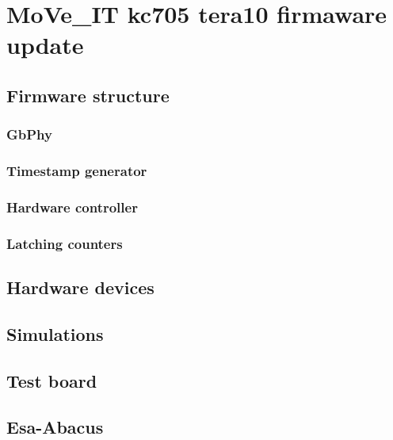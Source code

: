 \chapter{MoVe\_IT kc705 tera10 firmaware update}
\section{Firmware structure}
\subsection{GbPhy}
\subsection{Timestamp generator}
\subsection{Hardware controller}
\subsection{Latching counters}

\section{Hardware devices}

\section{Simulations}

\section{Test board}

\section{Esa-Abacus}
